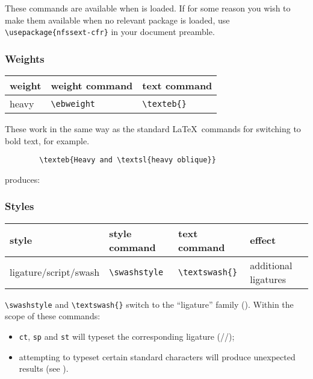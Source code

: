 \documentclass[11pt,british]{article}
\begin{document}
These commands are available when  is loaded. If for some reason you wish to make them available when no relevant package is loaded, use \verb|\usepackage{nfssext-cfr}| in your document preamble.

\subsubsection{Weights}

	\begin{longtable}{lll}
		\toprule
		\textbf{weight}		&	\textbf{weight command}	&	\textbf{text command}\\\midrule\endhead
		\bottomrule\endfoot
		heavy							&	\verb|\ebweight|					&	\verb|\texteb{}|\\
	\end{longtable}
	
	These work in the same way as the standard \LaTeX\ commands for switching to bold text, for example.
	\begin{verbatim}
		\texteb{Heavy and \textsl{heavy oblique}}
	\end{verbatim}
	produces:
	\begin{center}
	\end{center}
	
\subsubsection{Styles}

	\begin{longtable}{llll}
		\toprule
		\textbf{style}								&	\textbf{style command}	&	\textbf{text command}	&	\textbf{effect}\\\midrule\endhead
		\bottomrule\endfoot
		ligature/script/swash				&	\verb|\swashstyle|				&	\verb|\textswash{}|			&	additional ligatures\\
	\end{longtable}
		
	\verb|\swashstyle| and \verb|\textswash{}| switch to the ``ligature'' family (). Within the scope of these commands:
	\begin{itemize}
		\item \verb|ct|, \verb|sp| and \verb|st| will typeset the corresponding ligature (//);
		\item attempting to typeset certain standard characters will produce unexpected results (see ).
	\end{itemize}
	
\end{document}
